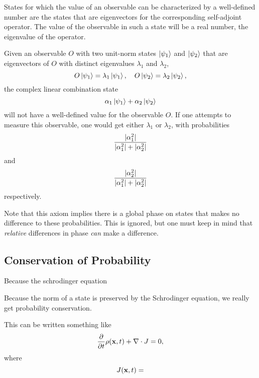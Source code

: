 \documentclass[a4paper]{article}
\begin{document}
\begin{axiom}[Measurement]
    States for which the value of an observable can be characterized by a well-defined number are the states that are eigenvectors for the corresponding self-adjoint operator. The value of the observable in such a state will be a real number, the eigenvalue of the operator.
\end{axiom}

\begin{axiom}
    Given an observable $O$ with two unit-norm states $\ket{\psi_1}$ and $\ket{\psi_2}$ that are eigenvectors of $O$ with distinct eigenvalues $\lambda_1$ and $\lambda_2$,
    $$
    O \ket{\psi_1} = \lambda_1 \ket{\psi_1}, \quad O\ket{\psi_2} = \lambda_2 \ket{\psi_2},
    $$
    the complex linear combination state 
    $$
    \alpha_1 \ket{\psi_1} + \alpha_2 \ket{\psi_2}
    $$
    will not have a well-defined value for the observable $O$. If one attempts to measure this observable, one would get either $\lambda_1$ or $\lambda_2$, with probabilities
    $$
    \frac{\lvert\alpha_1^2\rvert}{\lvert\alpha_1^2\rvert + \lvert\alpha_2^2\rvert}
    $$
    and
    $$
    \frac{\lvert\alpha_2^2\rvert}{\lvert\alpha_1^2\rvert + \lvert\alpha_2^2\rvert}
    $$
    respectively.
\end{axiom}

Note that this axiom implies there is a global phase on states that makes no difference to these probabilities. This is ignored, but one must keep in mind that \emph{relative} differences in phase \emph{can} make a difference.

\subsection{Conservation of Probability}

Because the schrodinger equation

Because the norm of a state is preserved by the Schrodinger equation, we really get probability conservation.

This can be written something like
$$
\frac{\partial}{\partial t} \rho(\mathbf{x}, t) + \nabla \cdot J = 0,
$$
where
$$
J(\mathbf{x}, t) = 
$$
\end{document}
